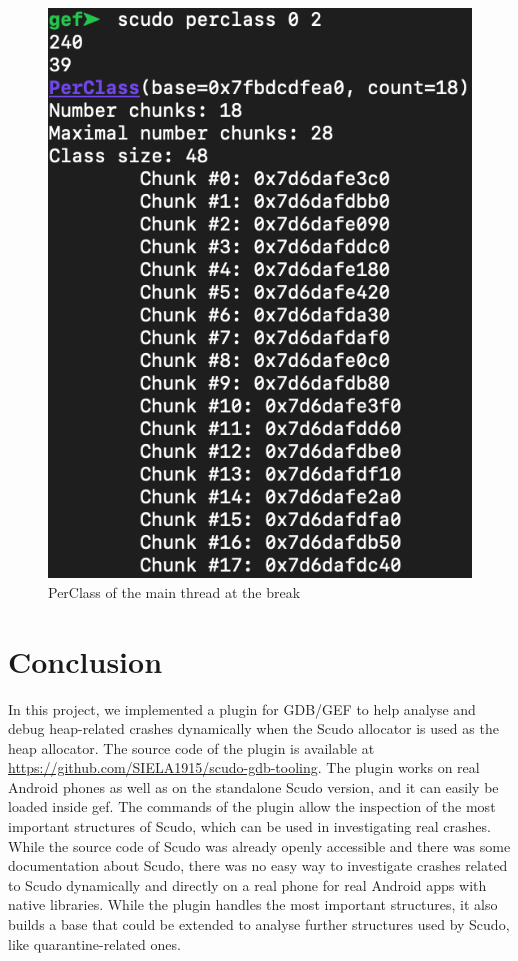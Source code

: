 \documentclass[a4paper,11pt,oneside]{report}
\begin{document}
\begin{figure}[h!]
  \centering
  \includegraphics[width=.5\linewidth]{figures/ScudoSmartbillBT13PerClassAfter.png}
  \caption{PerClass of the main thread at the break}
  \label{fig:ScudoSmartbillBT13PerClassAfter}
\end{figure}



\chapter{Conclusion}

In this project, we implemented a plugin for GDB/GEF to help analyse and debug
heap-related crashes dynamically when the Scudo allocator is used as the heap
allocator. The source code of the plugin is available at \url{https://github.com/SIELA1915/scudo-gdb-tooling}.
The plugin works on real Android phones as well as on the standalone Scudo
version, and it can easily be loaded inside gef. The commands of the plugin
allow the inspection of the most important structures of Scudo, which can
be used in investigating real crashes. While the source code of Scudo was
already openly accessible and there was some documentation about Scudo, there
was no easy way to investigate crashes related to Scudo dynamically and directly
on a real phone for real Android apps with native libraries. While the plugin
handles the most important structures, it also builds a base that could be
extended to analyse further structures used by Scudo, like quarantine-related ones.

\cleardoublepage{}
\printbibliography{}
\end{document}
